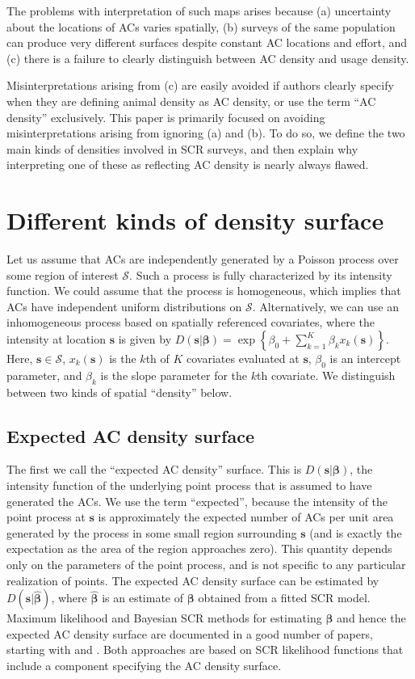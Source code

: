 \documentclass[useAMS,usenatbib,referee]{biom}
\begin{document}
The problems with interpretation of such maps arises because (a) uncertainty about the locations of ACs varies spatially, (b) surveys of the same population can produce very different surfaces despite constant AC locations and effort, and (c) there is a failure to clearly distinguish between AC density and usage density.

Misinterpretations arising from (c) are easily avoided if authors clearly specify when they are defining animal density as AC density, or use the term ``AC density'' exclusively. This paper is primarily focused on avoiding misinterpretations arising from ignoring (a) and (b). To do so, we define the two main kinds of densities involved in SCR surveys, and then explain why interpreting one of these as reflecting AC density is nearly always flawed.

\section{Different kinds of density surface}\label{different-densities}

Let us assume that ACs are independently generated by a Poisson process over some region of interest $\mathcal{S}$. Such a process is fully characterized by its intensity function. We could assume that the process is homogeneous, which implies that ACs have independent uniform distributions on $\mathcal{S}$. Alternatively, we can use an inhomogeneous process based on spatially referenced covariates, where the intensity at location $\bm{s}$ is given by $D(\bm{s}|\bm{\beta})=\exp\left\{\beta_0 + \sum_{k=1}^K\beta_kx_k(\bm{s})\right\}$. Here, $\bm{s} \in \mathcal{S}$, $x_k(\bm{s})$ is the $k$th of $K$ covariates evaluated at $\bm{s}$, $\beta_0$ is an intercept parameter, and $\beta_k$ is the slope parameter for the $k$th covariate. We distinguish between two kinds of spatial ``density'' below. 

\subsection{Expected AC density surface} \label{s:eacd}

The first we call the ``expected AC density'' surface. This is $D(\bm{s}|\bm{\beta})$, the intensity function of the underlying point process that is assumed to have generated the ACs. We use the term ``expected'', because the intensity of the point process at $\bm{s}$ is approximately the expected number of ACs per unit area generated by the process in some small region surrounding $\bm{s}$ (and is exactly the expectation as the area of the region approaches zero). This quantity depends only on the parameters of the point process, and is not specific to any particular realization of points. The expected AC density surface can be estimated by $D(\bm{s}|\hat{\bm{\beta}})$, where $\hat{\bm{\beta}}$ is an estimate of $\bm{\beta}$ obtained from a fitted SCR model. Maximum likelihood and Bayesian SCR methods for estimating $\bm{\beta}$ and hence the expected AC density surface are documented in a good number of papers, starting with \cite{Borchers+Efford:08} and \cite{Royle+Young:08}. Both approaches are based on SCR likelihood functions that include a component specifying the AC density surface. 
\end{document}

